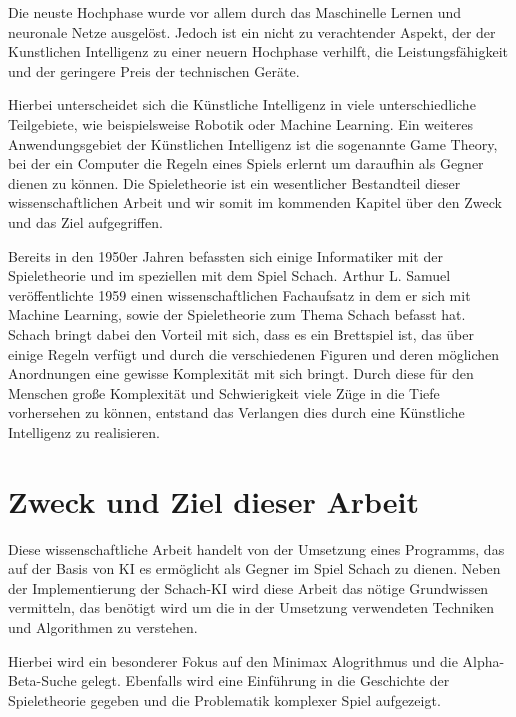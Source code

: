 
Die neuste Hochphase wurde vor allem durch das Maschinelle Lernen und neuronale Netze ausgelöst. Jedoch ist ein nicht zu verachtender Aspekt, der der Kunstlichen Intelligenz zu einer neuern Hochphase verhilft, die Leistungsfähigkeit und der geringere Preis der technischen Geräte. 

Hierbei unterscheidet sich die Künstliche Intelligenz in viele unterschiedliche Teilgebiete, wie beispielsweise Robotik oder Machine Learning. Ein weiteres Anwendungsgebiet der Künstlichen Intelligenz ist die sogenannte Game Theory, bei der ein Computer die Regeln eines Spiels erlernt um daraufhin als Gegner dienen zu können. Die Spieletheorie ist ein wesentlicher Bestandteil dieser wissenschaftlichen Arbeit und wir somit im kommenden Kapitel über den Zweck und das Ziel aufgegriffen.

Bereits in den 1950er Jahren befassten sich einige Informatiker mit der Spieletheorie und im speziellen mit dem Spiel Schach. Arthur L. Samuel veröffentlichte 1959 einen wissenschaftlichen Fachaufsatz in dem er sich mit Machine Learning, sowie der Spieletheorie zum Thema Schach befasst hat.\cite{Samuel1959} Schach bringt dabei den Vorteil mit sich, dass es ein Brettspiel ist, das über einige Regeln verfügt und durch die verschiedenen Figuren und deren möglichen Anordnungen eine gewisse Komplexität mit sich bringt. Durch diese für den Menschen große Komplexität und Schwierigkeit viele Züge in die Tiefe vorhersehen zu können, entstand das Verlangen dies durch eine Künstliche Intelligenz zu realisieren.

\section{Zweck und Ziel dieser Arbeit}
Diese wissenschaftliche Arbeit handelt von der Umsetzung eines Programms, das auf der Basis von KI es ermöglicht als Gegner im Spiel Schach zu dienen. Neben der Implementierung der Schach-KI wird diese Arbeit das nötige Grundwissen vermitteln, das benötigt wird um die in der Umsetzung verwendeten Techniken und Algorithmen zu verstehen. 

Hierbei wird ein besonderer Fokus auf den Minimax Alogrithmus und die Alpha-Beta-Suche gelegt. Ebenfalls wird eine Einführung in die Geschichte der Spieletheorie gegeben und die Problematik komplexer Spiel aufgezeigt.





